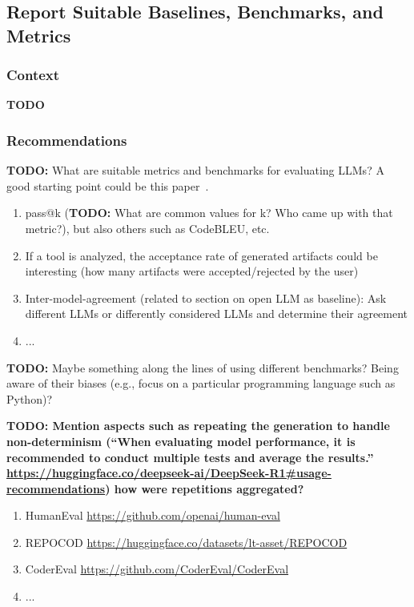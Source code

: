 \documentclass[11pt]{article}
\begin{document}
\subsection{Report Suitable Baselines, Benchmarks, and Metrics}

\subsubsection{Context}

\textbf{TODO}

\subsubsection{Recommendations}

\textbf{TODO:} What are suitable metrics and benchmarks for evaluating LLMs? A good starting point could be this paper~\cite{10.1145/3695988}.

\begin{enumerate}
\item pass@k (\textbf{TODO:} What are common values for k? Who came up with that metric?), but also others such as CodeBLEU, etc.
\item If a tool is analyzed, the acceptance rate of generated artifacts could be interesting (how many artifacts were accepted/rejected by the user)
\item Inter-model-agreement (related to section on open LLM as baseline): Ask different LLMs or differently considered LLMs and determine their agreement 
\item ...
\end{enumerate}

\textbf{TODO:} Maybe something along the lines of using different benchmarks? Being aware of their biases (e.g., focus on a particular programming language such as Python)?

\textbf{TODO: Mention aspects such as repeating the generation to handle non-determinism (``When evaluating model performance, it is recommended to conduct multiple tests and average the results.''  \url{https://huggingface.co/deepseek-ai/DeepSeek-R1\#usage-recommendations}) how were repetitions aggregated?}

\begin{enumerate}
\item HumanEval \url{https://github.com/openai/human-eval}
\item REPOCOD \url{https://huggingface.co/datasets/lt-asset/REPOCOD}
\item CoderEval \url{https://github.com/CoderEval/CoderEval}
\item ...
\end{enumerate}
\end{document}
